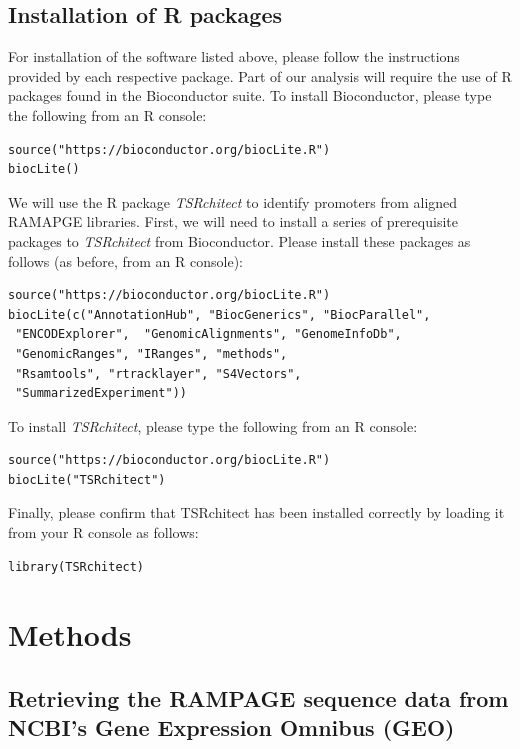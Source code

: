 \documentclass[runningheads,a4paper]{llncs}
\begin{document}
\begin{linenumbers}
\subsection{Installation of R packages}
For installation of the software listed above, please follow the instructions provided by each respective package. 
Part of our analysis will require the use of R packages found in the Bioconductor suite.
To install Bioconductor, please type the following from an R console: 

\noindent
\begin{verbatim}
source("https://bioconductor.org/biocLite.R")
biocLite()
\end{verbatim}

We will use the R package \textit{TSRchitect} to identify promoters from aligned RAMAPGE libraries. 
First, we will need to install a series of prerequisite packages to \textit{TSRchitect} from Bioconductor.
Please install these packages as follows (as before, from an R console):

\noindent
\begin{verbatim}
source("https://bioconductor.org/biocLite.R")
biocLite(c("AnnotationHub", "BiocGenerics", "BiocParallel",
 "ENCODExplorer",  "GenomicAlignments", "GenomeInfoDb",
 "GenomicRanges", "IRanges", "methods", 
 "Rsamtools", "rtracklayer", "S4Vectors",
 "SummarizedExperiment"))
\end{verbatim}

To install \textit{TSRchitect}, please type the following from an R console:

\noindent
\begin{verbatim}
source("https://bioconductor.org/biocLite.R")
biocLite("TSRchitect")
\end{verbatim}

Finally, please confirm that TSRchitect has been installed correctly by loading it from your R console as follows:

\noindent
\begin{verbatim}
library(TSRchitect)
\end{verbatim}

\section{Methods}

\subsection{Retrieving the RAMPAGE sequence data from NCBI's Gene Expression Omnibus (GEO)}


\end{linenumbers}
\end{document}
